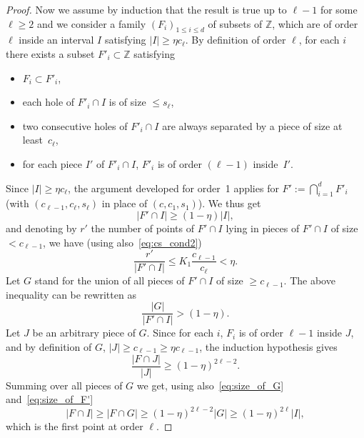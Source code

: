 \documentclass[AHL,Unicode,longabstracts]{cedram}
\newcommand{\egdef}{:=}
\newcommand{\ZZ}{\mathbb{Z}}
\begin{document}
\begin{proof}
Now we assume by induction that the result is true up to $\ell-1$ for some $\ell\ge2$ and we consider a family $(F_i)_{1\le i\le d}$ of subsets of $\ZZ$, which are of order $\ell$ inside an interval $I$ satisfying $|I|\ge \eta c_\ell$. By definition of order $\ell$, for each $i$ there exists a subset $F'_i\subset\ZZ$ satisfying
\begin{itemize}
\item $F_i\subset F'_i$,
\item each hole of $F'_i\cap I$ is of size $\le s_\ell$,
\item two consecutive holes of $F'_i\cap I$ are always separated by a piece of size at least~$c_\ell$,
\item for each piece $I'$ of $F'_i\cap I$, $F'_i$ is of order $(\ell-1)$ inside~$I'$.
\end{itemize}
Since $|I|\ge \eta c_\ell$, the argument developed for order~1 applies for $F'\egdef \bigcap_{i=1}^d F'_i$ (with $(c_{\ell-1},c_\ell,s_\ell)$ in place of $(c,c_1,s_1)$). We thus get
\begin{equation}\label{eq:size_of_F'}
|F'\cap I| \ge (1-\eta)|I|,
\end{equation}
and denoting by $r'$ the number of points of $F'\cap I$ lying in pieces of $F'\cap I$ of size $<c_{\ell-1}$, we have (using also~\eqref{eq:cs_cond2})
\begin{equation}\label{eq:r'}
\frac{r'}{|F'\cap I|} \le K_1 \frac{c_{\ell-1}}{c_\ell}<\eta.
\end{equation}
Let $G$ stand for the union of all pieces of $F'\cap I$ of size $\ge c_{\ell-1}$. The above inequality can be rewritten as
\begin{equation}\label{eq:size_of_G}
\frac{|G|}{|F'\cap I|} > (1-\eta).
\end{equation}
Let $J$ be an arbitrary piece of $G$. Since for each $i$, $F_i$ is of order $\ell-1$ inside $J$, and by definition of $G$, $|J|\ge c_{\ell-1}\ge \eta c_{\ell-1}$, the induction hypothesis gives
\[
\frac{|F\cap J|}{|J|} \ge (1-\eta)^{2{\ell-2}}.
\]
Summing over all pieces of $G$ we get, using also~\eqref{eq:size_of_G} and~\eqref{eq:size_of_F'}
\begin{equation}\label{eq:density}
|F\cap I|\ge |F\cap G| \ge (1-\eta)^{2{\ell-2}} |G| \ge (1-\eta)^{2\ell}|I|,
\end{equation}
which is the first point at order $\ell$.


\end{proof}
\end{document}

